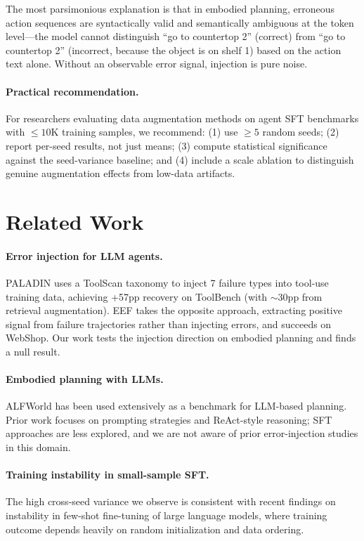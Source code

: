 \documentclass[11pt,a4paper]{article}
\begin{document}
The most parsimonious explanation is that in embodied planning, erroneous action sequences are syntactically valid and semantically ambiguous at the token level---the model cannot distinguish ``go to countertop 2'' (correct) from ``go to countertop 2'' (incorrect, because the object is on shelf 1) based on the action text alone.
Without an observable error signal, injection is pure noise.

\paragraph{Practical recommendation.}
For researchers evaluating data augmentation methods on agent SFT benchmarks with ${\leq}10$K training samples, we recommend: (1) use ${\geq}5$ random seeds; (2) report per-seed results, not just means; (3) compute statistical significance against the seed-variance baseline; and (4) include a scale ablation to distinguish genuine augmentation effects from low-data artifacts.

\section{Related Work}

\paragraph{Error injection for LLM agents.}
PALADIN uses a ToolScan taxonomy to inject 7 failure types into tool-use training data, achieving +57pp recovery on ToolBench (with ${\sim}30$pp from retrieval augmentation).
EEF takes the opposite approach, extracting positive signal from failure trajectories rather than injecting errors, and succeeds on WebShop.
Our work tests the injection direction on embodied planning and finds a null result.

\paragraph{Embodied planning with LLMs.}
ALFWorld has been used extensively as a benchmark for LLM-based planning.
Prior work focuses on prompting strategies and ReAct-style reasoning; SFT approaches are less explored, and we are not aware of prior error-injection studies in this domain.

\paragraph{Training instability in small-sample SFT.}
The high cross-seed variance we observe is consistent with recent findings on instability in few-shot fine-tuning of large language models, where training outcome depends heavily on random initialization and data ordering.
\end{document}
